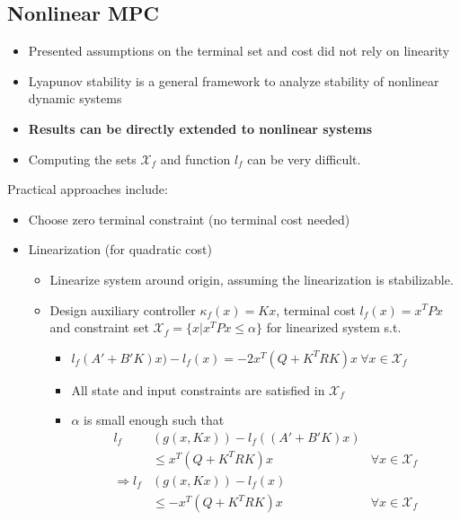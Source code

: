 \documentclass[8pt,a4paper]{scrartcl}
\begin{document}
\begin{multicols*}{3}
\begin{multicols*}{4}
%
%
%

\section{Nonlinear MPC}

\begin{itemize}
\item Presented assumptions on the terminal set and cost did not rely on linearity
\item Lyapunov stability is a general framework to analyze stability of nonlinear dynamic systems
\item \textbf{Results can be directly extended to nonlinear systems}
\item Computing the sets $\mathcal{X}_f$ and function $l_f$ can be very difficult.
\end{itemize}

Practical approaches include:

\begin{itemize}
\item Choose zero terminal constraint (no terminal cost needed)
\item Linearization (for quadratic cost)
\begin{itemize}
\item Linearize system around origin, assuming the linearization is stabilizable.
\item Design auxiliary controller $\kappa_f(x)=Kx$, terminal cost $l_f(x)=x^TPx$ and constraint set $\mathcal{X}_f=\{x|x^TPx\leq\alpha\}$ for linearized system s.t.

\begin{itemize}
\item $l_f(A'+B'K)x)-l_f(x)=-2x^T(Q+K^TRK)x\ \forall x\in\mathcal{X}_f$
\item All state and input constraints are satisfied in $\mathcal{X}_f$
\item $\alpha$ is small enough such that
\begin{align*}
l_f&(g(x,Kx))-l_f((A'+B'K)x)\\
&\leq x^T(Q+K^TRK)x&\forall x\in\mathcal{X}_f\\
\Rightarrow l_f&(g(x,Kx))-l_f(x)\\
&\leq -x^T(Q+K^TRK)x&\forall x\in\mathcal{X}_f
\end{align*}


\end{itemize}
\end{itemize}
\end{itemize}
\end{multicols*}
\end{multicols*}
\end{document}
